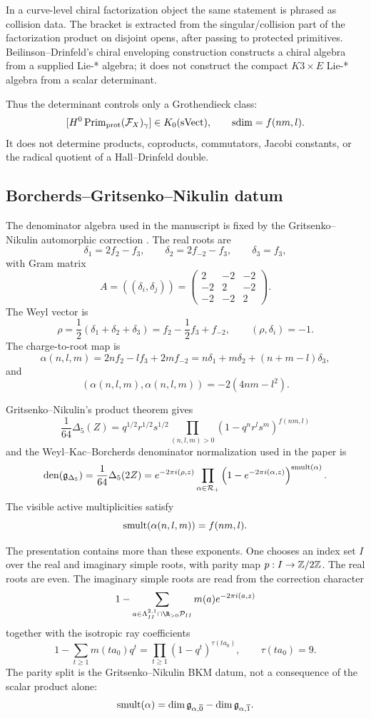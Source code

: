In a curve-level chiral factorization object the same statement is phrased
as collision data.  The bracket is extracted from the singular/collision
part of the factorization product on disjoint opens, after passing to
protected primitives.  Beilinson--Drinfeld's chiral enveloping construction
constructs a chiral algebra from a supplied Lie-* algebra; it does not
construct the compact \(K3\times E\) Lie-* algebra from a scalar
determinant.

Thus the determinant controls only a Grothendieck class:
\[
[H^0\operatorname{Prim}_{\mathrm{prot}}(\mathcal F_X)_\gamma]\in K_0(\mathrm{sVect}),
\qquad
\operatorname{sdim}=f(nm,l).
\]
It does not determine products, coproducts, commutators, Jacobi constants,
or the radical quotient of a Hall--Drinfeld double.

\subsection{Borcherds--Gritsenko--Nikulin datum}

The denominator algebra used in the manuscript is fixed by the
Gritsenko--Nikulin automorphic correction \cite{GN}.  The real roots are
\[
\delta_1=2f_2-f_3,\qquad
\delta_2=2f_{-2}-f_3,\qquad
\delta_3=f_3,
\]
with Gram matrix
\[
A=((\delta_i,\delta_j))=
\begin{pmatrix}
2&-2&-2\\
-2&2&-2\\
-2&-2&2
\end{pmatrix}.
\]
The Weyl vector is
\[
\rho=\frac12(\delta_1+\delta_2+\delta_3)
=f_2-\frac12f_3+f_{-2},
\qquad
(\rho,\delta_i)=-1 .
\]
The charge-to-root map is
\[
\alpha(n,l,m)=2nf_2-lf_3+2mf_{-2}
=n\delta_1+m\delta_2+(n+m-l)\delta_3,
\]
and
\[
(\alpha(n,l,m),\alpha(n,l,m))=-2(4nm-l^2).
\]

Gritsenko--Nikulin's product theorem gives
\[
\frac1{64}\Delta_5(Z)
=
q^{1/2}r^{1/2}s^{1/2}
\prod_{(n,l,m)>0}
(1-q^nr^ls^m)^{f(nm,l)}
\]
and the Weyl--Kac--Borcherds denominator normalization used in the paper is
\[
\operatorname{den}(\mathfrak g_{\Delta_5})
=
\frac1{64}\Delta_5(2Z)
=
e^{-2\pi i(\rho,z)}
\prod_{\alpha\in\mathcal R_+}
\left(1-e^{-2\pi i(\alpha,z)}\right)^{\operatorname{smult}(\alpha)}.
\]
The visible active multiplicities satisfy
\[
\operatorname{smult}(\alpha(n,l,m))=f(nm,l).
\]

The presentation contains more than these exponents.  One chooses an index
set \(I\) over the real and imaginary simple roots, with parity map
\(p:I\to\mathbb Z/2\mathbb Z\).  The real roots are even.  The imaginary simple roots are
read from the correction character
\[
1-\sum_{a\in\La^{2,1}_{II}\cap\R_{>0}\mathcal P_{II}}
m(a)e^{-2\pi i(a,z)}
\]
together with the isotropic ray coefficients
\[
1-\sum_{t\ge1}m(ta_0)q^t
=\prod_{t\ge1}(1-q^t)^{\tau(ta_0)},\qquad
\tau(ta_0)=9.
\]
The parity split is the Gritsenko--Nikulin BKM datum, not a consequence of
the scalar product alone:
\[
\operatorname{smult}(\alpha)
=\dim\mathfrak g_{\alpha,\overline0}
-\dim\mathfrak g_{\alpha,\overline1}.
\]

